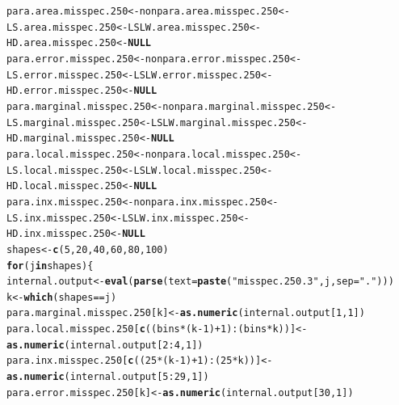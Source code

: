 \documentclass[11pt]{article}\usepackage[]{graphicx}\usepackage[]{color}
\makeatletter
\newcommand{\hlnum}[1]{\textcolor[rgb]{0.686,0.059,0.569}{#1}}%
\newcommand{\hlstr}[1]{\textcolor[rgb]{0.192,0.494,0.8}{#1}}%
\newcommand{\hlopt}[1]{\textcolor[rgb]{0,0,0}{#1}}%
\newcommand{\hlstd}[1]{\textcolor[rgb]{0.345,0.345,0.345}{#1}}%
\newcommand{\hlkwa}[1]{\textcolor[rgb]{0.161,0.373,0.58}{\textbf{#1}}}%
\newcommand{\hlkwb}[1]{\textcolor[rgb]{0.69,0.353,0.396}{#1}}%
\newcommand{\hlkwc}[1]{\textcolor[rgb]{0.333,0.667,0.333}{#1}}%
\newcommand{\hlkwd}[1]{\textcolor[rgb]{0.737,0.353,0.396}{\textbf{#1}}}%
\newenvironment{kframe}{%
 \def\at@end@of@kframe{}%
 \ifinner\ifhmode%
  \def\at@end@of@kframe{\end{minipage}}%
  \begin{minipage}{\columnwidth}%
 \fi\fi%
 \def\FrameCommand##1{\hskip\@totalleftmargin \hskip-\fboxsep
 \colorbox{shadecolor}{##1}\hskip-\fboxsep
     \hskip-\linewidth \hskip-\@totalleftmargin \hskip\columnwidth}%
 \MakeFramed {\advance\hsize-\width
   \@totalleftmargin\z@ \linewidth\hsize
   \@setminipage}}%
 {\par\unskip\endMakeFramed%
 \at@end@of@kframe}
\newenvironment{knitrout}{}{} %
\makeatother
\begin{document}
\begin{knitrout}
\color{fgcolor}\begin{kframe}
\begin{alltt}
\hlstd{para.area.misspec.250} \hlkwb{<-} \hlstd{nonpara.area.misspec.250} \hlkwb{<-}
  \hlstd{LS.area.misspec.250} \hlkwb{<-} \hlstd{LSLW.area.misspec.250} \hlkwb{<-}
  \hlstd{HD.area.misspec.250} \hlkwb{<-} \hlkwa{NULL}
\hlstd{para.error.misspec.250} \hlkwb{<-} \hlstd{nonpara.error.misspec.250} \hlkwb{<-}
  \hlstd{LS.error.misspec.250} \hlkwb{<-} \hlstd{LSLW.error.misspec.250} \hlkwb{<-}
  \hlstd{HD.error.misspec.250} \hlkwb{<-} \hlkwa{NULL}
\hlstd{para.marginal.misspec.250} \hlkwb{<-} \hlstd{nonpara.marginal.misspec.250} \hlkwb{<-}
  \hlstd{LS.marginal.misspec.250} \hlkwb{<-} \hlstd{LSLW.marginal.misspec.250} \hlkwb{<-}
  \hlstd{HD.marginal.misspec.250} \hlkwb{<-} \hlkwa{NULL}
\hlstd{para.local.misspec.250} \hlkwb{<-} \hlstd{nonpara.local.misspec.250} \hlkwb{<-}
  \hlstd{LS.local.misspec.250} \hlkwb{<-} \hlstd{LSLW.local.misspec.250} \hlkwb{<-}
  \hlstd{HD.local.misspec.250} \hlkwb{<-} \hlkwa{NULL}
\hlstd{para.inx.misspec.250} \hlkwb{<-} \hlstd{nonpara.inx.misspec.250} \hlkwb{<-}
  \hlstd{LS.inx.misspec.250} \hlkwb{<-} \hlstd{LSLW.inx.misspec.250} \hlkwb{<-}
  \hlstd{HD.inx.misspec.250} \hlkwb{<-} \hlkwa{NULL}
\hlstd{shapes} \hlkwb{<-} \hlkwd{c}\hlstd{(}\hlnum{5}\hlstd{,} \hlnum{20}\hlstd{,} \hlnum{40}\hlstd{,} \hlnum{60}\hlstd{,} \hlnum{80}\hlstd{,} \hlnum{100}\hlstd{)}
\hlkwa{for}\hlstd{(j} \hlkwa{in} \hlstd{shapes )\{}
  \hlstd{internal.output} \hlkwb{<-} \hlkwd{eval}\hlstd{(}\hlkwd{parse}\hlstd{(}\hlkwc{text}\hlstd{=}\hlkwd{paste}\hlstd{(}\hlstr{"misspec.250.3"}\hlstd{, j,} \hlkwc{sep} \hlstd{=} \hlstr{"."}\hlstd{)))}
  \hlstd{k} \hlkwb{<-} \hlkwd{which}\hlstd{(shapes} \hlopt{==} \hlstd{j)}
  \hlstd{para.marginal.misspec.250[k]} \hlkwb{<-} \hlkwd{as.numeric}\hlstd{(internal.output[}\hlnum{1}\hlstd{,} \hlnum{1}\hlstd{])}
  \hlstd{para.local.misspec.250[}\hlkwd{c}\hlstd{((bins}\hlopt{*}\hlstd{(k}\hlopt{-}\hlnum{1}\hlstd{)}\hlopt{+}\hlnum{1}\hlstd{)}\hlopt{:}\hlstd{(bins}\hlopt{*}\hlstd{k))]} \hlkwb{<-}
    \hlkwd{as.numeric}\hlstd{(internal.output[}\hlnum{2}\hlopt{:}\hlnum{4}\hlstd{,} \hlnum{1}\hlstd{])}
  \hlstd{para.inx.misspec.250[}\hlkwd{c}\hlstd{((}\hlnum{25}\hlopt{*}\hlstd{(k}\hlopt{-}\hlnum{1}\hlstd{)}\hlopt{+}\hlnum{1}\hlstd{)}\hlopt{:}\hlstd{(}\hlnum{25}\hlopt{*}\hlstd{k))]} \hlkwb{<-}
    \hlkwd{as.numeric}\hlstd{(internal.output[}\hlnum{5}\hlopt{:}\hlnum{29}\hlstd{,} \hlnum{1}\hlstd{])}
  \hlstd{para.error.misspec.250[k]} \hlkwb{<-} \hlkwd{as.numeric}\hlstd{(internal.output[}\hlnum{30}\hlstd{,} \hlnum{1}\hlstd{])}

\end{alltt}
\end{kframe}
\end{knitrout}
\end{document}
